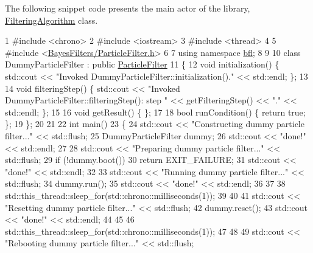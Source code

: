 The following snippet code presents the main actor of the library, \mbox{\hyperlink{classbfl_1_1FilteringAlgorithm}{Filtering\+Algorithm}} class.~\newline



\begin{DoxyCodeInclude}
1 \textcolor{preprocessor}{#include <chrono>}
2 \textcolor{preprocessor}{#include <iostream>}
3 \textcolor{preprocessor}{#include <thread>}
4 
5 \textcolor{preprocessor}{#include <\mbox{\hyperlink{ParticleFilter_8h}{BayesFilters/ParticleFilter.h}}>}
6 
7 \textcolor{keyword}{using namespace }\mbox{\hyperlink{namespacebfl}{bfl}};
8 
9 
10 \textcolor{keyword}{class }DummyParticleFilter : \textcolor{keyword}{public} \mbox{\hyperlink{classbfl_1_1ParticleFilter}{ParticleFilter}}
11 \{
12     \textcolor{keywordtype}{void} initialization() \{ std::cout << \textcolor{stringliteral}{"Invoked DummyParticleFilter::initialization()."} << std::endl; \};
13 
14     \textcolor{keywordtype}{void} filteringStep() \{ std::cout << \textcolor{stringliteral}{"Invoked DummyParticleFilter::filteringStep(): step "} << 
      getFilteringStep() << \textcolor{stringliteral}{"."} << std::endl; \};
15 
16     \textcolor{keywordtype}{void} getResult() \{ \};
17 
18     \textcolor{keywordtype}{bool} runCondition() \{ \textcolor{keywordflow}{return} \textcolor{keyword}{true}; \};
19 \};
20 
21 
22 \textcolor{keywordtype}{int} main()
23 \{
24     std::cout << \textcolor{stringliteral}{"Constructing dummy particle filter..."} << std::flush;
25     DummyParticleFilter dummy;
26     std::cout << \textcolor{stringliteral}{"done!"} << std::endl;
27 
28     std::cout << \textcolor{stringliteral}{"Preparing dummy particle filter..."} << std::flush;
29     \textcolor{keywordflow}{if} (!dummy.boot())
30         \textcolor{keywordflow}{return} EXIT\_FAILURE;
31     std::cout << \textcolor{stringliteral}{"done!"} << std::endl;
32 
33     std::cout << \textcolor{stringliteral}{"Running dummy particle filter..."} << std::flush;
34     dummy.run();
35     std::cout << \textcolor{stringliteral}{"done!"} << std::endl;
36 
37 
38     std::this\_thread::sleep\_for(std::chrono::milliseconds(1));
39 
40 
41     std::cout << \textcolor{stringliteral}{"Resetting dummy particle filter..."} << std::flush;
42     dummy.reset();
43     std::cout << \textcolor{stringliteral}{"done!"} << std::endl;
44 
45 
46     std::this\_thread::sleep\_for(std::chrono::milliseconds(1));
47 
48 
49     std::cout << \textcolor{stringliteral}{"Rebooting dummy particle filter..."} << std::flush;

\end{DoxyCodeInclude}
